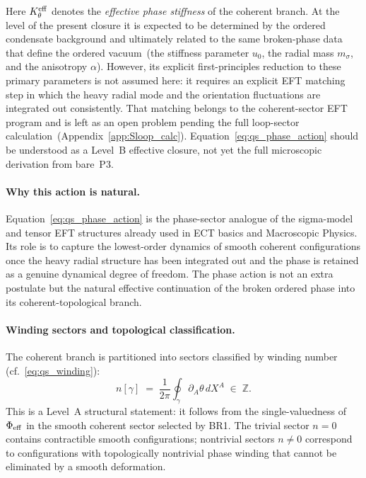 \documentclass[11pt,a4paper]{article}
\numberwithin{equation}{section}
\begin{document}
Here $K_\theta^{\rm eff}$ denotes the \emph{effective phase stiffness}
of the coherent branch.
At the level of the present closure it is expected to be determined by
the ordered condensate background and ultimately related to the same
broken-phase data that define the ordered vacuum~(the stiffness
parameter $u_0$, the radial mass $m_\sigma$, and the anisotropy
$\alpha$).
However, its explicit first-principles reduction to these primary
parameters is not assumed here: it requires an explicit EFT matching
step in which the heavy radial mode and the orientation fluctuations are
integrated out consistently.
That matching belongs to the coherent-sector EFT program and is
left as an open problem pending the full loop-sector
calculation~(Appendix~\ref{app:Sloop_calc}).
Equation~\eqref{eq:qs_phase_action} should be understood as a
Level~B effective closure, not yet the full microscopic derivation
from bare~P3.

\paragraph{Why this action is natural.}
Equation~\eqref{eq:qs_phase_action} is the phase-sector analogue of
the sigma-model and tensor EFT structures already used in ECT basics
and Macroscopic Physics.
Its role is to capture the lowest-order dynamics of smooth coherent
configurations once the heavy radial structure has been integrated out
and the phase is retained as a genuine dynamical degree of freedom.
The phase action is not an extra postulate but the natural effective
continuation of the broken ordered phase into its coherent-topological
branch.

\paragraph{Winding sectors and topological classification.}
The coherent branch is partitioned into sectors classified by winding
number (cf.~\eqref{eq:qs_winding}):
\begin{equation}
  \label{eq:qs_winding_sector}
  n[\gamma] \;=\; \frac{1}{2\pi}
  \oint_\gamma \partial_A\theta\,dX^A \;\in\; \mathbb{Z}.
\end{equation}
This is a Level~A structural statement: it follows from the
single-valuedness of $\Phi_{\rm eff}$ in the smooth coherent sector
selected by BR1.
The trivial sector $n=0$ contains contractible smooth configurations;
nontrivial sectors $n\neq0$ correspond to configurations with
topologically nontrivial phase winding that cannot be eliminated by
a smooth deformation.
\end{document}

